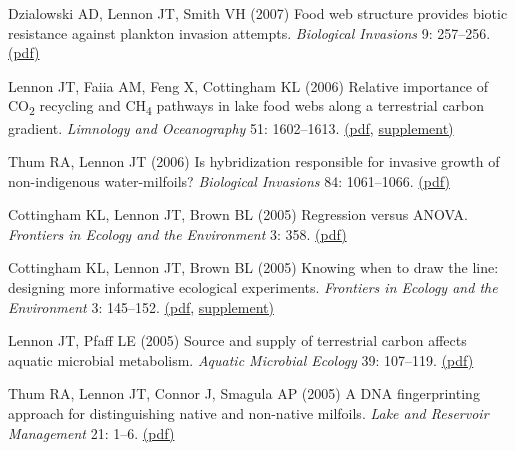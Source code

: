 \documentclass[11pt]{article}
\begin{document}
\begin{etaremune}
\item Dzialowski AD, Lennon JT, Smith VH (2007) Food web structure provides biotic resistance against plankton invasion attempts. \textit{Biological Invasions} 9: 257–256. \href{https://lennonlab.github.io/assets/publications/Dzialowski_etal_2007.pdf}{(pdf)}

\item Lennon JT, Faiia AM, Feng X, Cottingham KL (2006) Relative importance of CO\textsubscript{2} recycling and CH\textsubscript{4} pathways in lake food webs along a terrestrial carbon gradient. \textit{Limnology and Oceanography} 51: 1602–1613. \href{https://lennonlab.github.io/assets/publications/Lennon_etal_2006.pdf}{(pdf}, \href{https://lennonlab.github.io/assets/publications/Lennon_etal_2006_Suppl.pdf}{supplement)}

\item Thum RA, Lennon JT (2006) Is hybridization responsible for invasive growth of non-indigenous water-milfoils? \textit{Biological Invasions} 84: 1061–1066. \href{https://lennonlab.github.io/assets/publications/Thum_Lennon_2006.pdf}{(pdf)}

\item Cottingham KL, Lennon JT, Brown BL (2005) Regression versus ANOVA. \textit{Frontiers in Ecology and the Environment} 3: 358. \href{https://lennonlab.github.io/assets/publications/Cottingham_etal_2005b.pdf}{(pdf)}

\item Cottingham KL, Lennon JT, Brown BL (2005) Knowing when to draw the line: designing more informative ecological experiments. \textit{Frontiers in Ecology and the Environment} 3: 145–152. \href{https://lennonlab.github.io/assets/publications/Cottingham_etal_2005a.pdf}{(pdf}, \href{https://lennonlab.github.io/assets/publications/Cottingham_etal_2005a_Suppl.pdf}{supplement)}

\item Lennon JT, Pfaff LE (2005) Source and supply of terrestrial carbon affects aquatic microbial metabolism. \textit{Aquatic Microbial Ecology} 39: 107–119. \href{https://lennonlab.github.io/assets/publications/Lennon_Pfaff_2005.pdf}{(pdf)}

\item Thum RA, Lennon JT, Connor J, Smagula AP (2005) A DNA fingerprinting approach for distinguishing native and non-native milfoils. \textit{Lake and Reservoir Management} 21: 1–6. \href{https://lennonlab.github.io/assets/publications/Thum_etal_2005.pdf}{(pdf)}


\end{etaremune}
\end{document}

